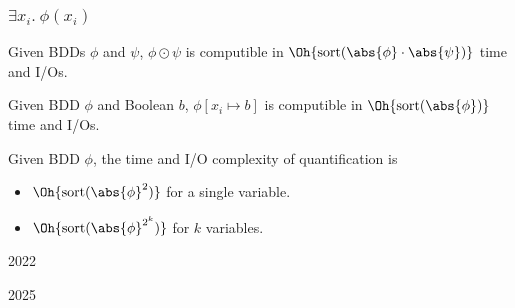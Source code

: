 \documentclass[english, aspectratio=169]{beamer}
\newcommand{\sort}[1]{\text{sort}(#1)}
\begin{document}
\begin{frame}
  \frametitle{$\exists x_i .\ \phi(x_i)$}

  \begin{theorem}
    Given BDDs $\phi$ and $\psi$, $\phi \odot \psi$ is computible in
    $\Oh{\sort{\abs{\phi} \cdot \abs{\psi}}}$ time and I/Os.
  \end{theorem}

  \medskip

  \begin{theorem}[S{\o}lvsten et al.~'22]
    Given BDD $\phi$ and Boolean $b$, $\phi[x_i \mapsto b]$ is computible in
    $\Oh{\sort{\abs{\phi}}}$ time and I/Os.
  \end{theorem}

  \medskip\pause

  \begin{corollary}[S{\o}elvsten et al.~'22]
    Given BDD $\phi$, the time and I/O complexity of quantification is
    \vspace{-8pt}
    \begin{itemize}
    \item $\Oh{\sort{\abs{\phi}^2}}$ for a single variable.
    \item $\Oh{\sort{\abs{\phi}^{2^k}}}$ for $k$ variables.
    \end{itemize}
  \end{corollary}
\end{frame}

\begin{frame}

  \begin{center}
    \bf
    {\fontsize{42}{50}\selectfont {}}

    \vspace{10pt}

    {\Huge 2022}
  \end{center}
\end{frame}



\begin{frame}

  \begin{center}
    \bf
    {\fontsize{42}{50}\selectfont {}}

    \vspace{10pt}

    {\Huge 2025}
  \end{center}
\end{frame}
\end{document}
